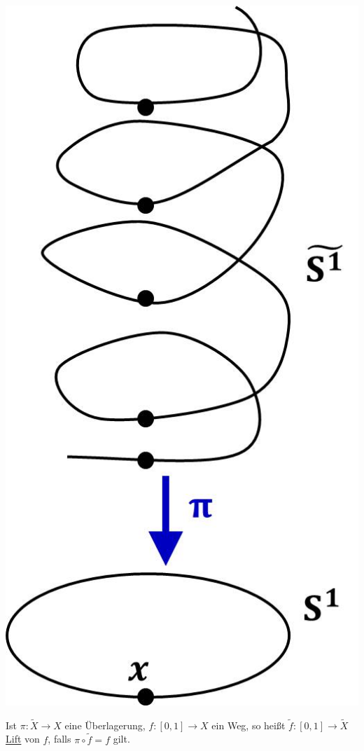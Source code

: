 \documentclass[a4paper,11pt,notitlepage]{report}
\theoremstyle{definition}
\begin{document}
\begin{center}
	\includegraphics[scale=0.5]{images/2011_12_19_Bild1.jpg}
\end{center}

\begin{definition}[Lift]
	Ist $\pi \colon \widetilde{X} \rightarrow X$ eine Überlagerung, $f \colon [0,1] \rightarrow X$ ein Weg, so heißt $\widetilde{f} \colon [0,1] \rightarrow \widetilde{X}$ \underline{Lift} von $f$, falls $\pi \circ \widetilde{f} = f$ gilt.
\end{definition}
\end{document}
